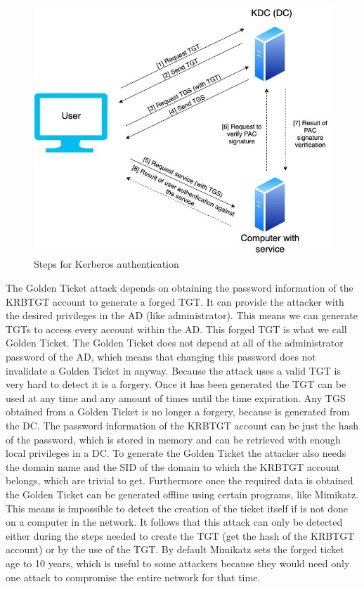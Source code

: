 \begin{figure}[H]
	\label{kerberos_exchange}
	\centering
	\includegraphics[width=.8\textwidth]{figuras/TGT_TGS_PAC.jpg}
	\caption{Steps for Kerberos authentication}
\end{figure}
\linej
The Golden Ticket attack depends on obtaining the password information of the KRBTGT account to generate a forged TGT. It can provide the attacker with the desired privileges in the AD (like administrator).
\linej
This means we can generate TGTs to access every account within the AD. This forged TGT is what we call Golden Ticket.
The Golden Ticket does not depend at all of the administrator password of the AD, which means that changing this password does not invalidate a Golden Ticket in anyway.
\linej
\linej
Because the attack uses a valid TGT is very hard to detect it is a forgery. Once it has been generated the TGT can be used at any time and any amount of times until the time expiration.
Any TGS obtained from a Golden Ticket is no longer a forgery, because is generated from the DC.
\linej
\linej
The password information of the KRBTGT account can be just the hash of the password, which is stored in memory and can be retrieved with enough local privileges in a DC. To generate the Golden Ticket the attacker also needs the domain name and the SID of the domain to which the KRBTGT account belongs, which are trivial to get\cite{stealthbits}.
\linej
Furthermore once the required data is obtained the Golden Ticket can be generated offline using certain programs, like Mimikatz. This means is impossible to detect the creation of the ticket itself if is not done on a computer in the network.
\linej
It follows that this attack can only be detected either during the steps needed to create the TGT (get the hash of the KRBTGT account) or by the use of the TGT.
\linej
\linej
By default Mimikatz sets the forged ticket age to 10 years, which is useful to some attackers because they would need only one attack to compromise the entire network for that time.

